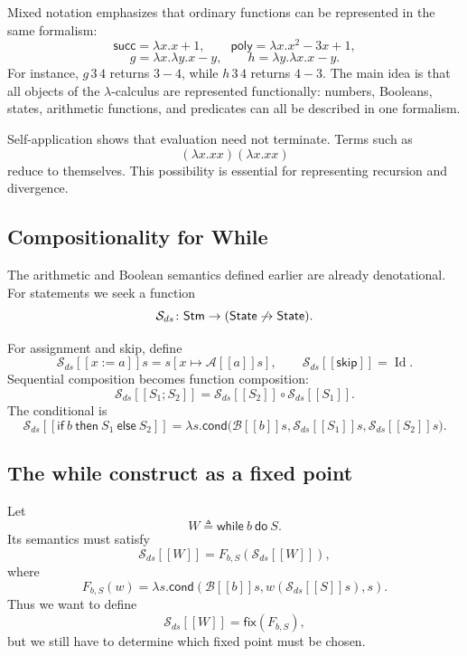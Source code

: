 \documentclass[a4paper]{article}
\newcommand{\State}{\mathsf{State}}
\newcommand{\Stm}{\mathsf{Stm}}
\newcommand{\skipc}{\mathsf{skip}}
\newcommand{\cond}{\mathsf{cond}}
\newcommand{\fix}{\mathsf{fix}}
\newcommand{\Id}{\operatorname{Id}}
\newcommand{\sem}[1]{[\![#1]\!]}
\begin{document}
Mixed notation emphasizes that ordinary functions can be represented in the same formalism:
\[
    \mathsf{succ}=\lambda x.x+1,
    \qquad
    \mathsf{poly}=\lambda x.x^2-3x+1,
\]
\[
    g=\lambda x.\lambda y.x-y,
    \qquad
    h=\lambda y.\lambda x.x-y.
\]
For instance, \(g\,3\,4\) returns \(3-4\), while \(h\,3\,4\) returns \(4-3\).
The main idea is that all objects of the \(\lambda\)-calculus are represented functionally: numbers, Booleans, states, arithmetic functions, and predicates can all be described in one formalism.

Self-application shows that evaluation need not terminate. Terms such as
\[
    (\lambda x.xx)(\lambda x.xx)
\]
reduce to themselves.
This possibility is essential for representing recursion and divergence.

\subsection{Compositionality for While}

The arithmetic and Boolean semantics defined earlier are already denotational.
For statements we seek a function
\[
    \mathcal S_{ds}\colon\Stm\fromto(\State\not\to\State).
\]

For assignment and skip, define
\[
    \mathcal S_{ds}\sem{x:=a}s
    =s[x\mapsto\mathcal A\sem{a}s],
    \qquad
    \mathcal S_{ds}\sem{\skipc}=\Id.
\]
Sequential composition becomes function composition:
\[
    \mathcal S_{ds}\sem{S_1;S_2}
    =
    \mathcal S_{ds}\sem{S_2}\circ\mathcal S_{ds}\sem{S_1}.
\]
The conditional is
\[
    \mathcal S_{ds}\sem{\mathsf{if}\ b\ \mathsf{then}\ S_1\ \mathsf{else}\ S_2}
    =
    \lambda s.\cond\bigl(
        \mathcal B\sem{b}s,
        \mathcal S_{ds}\sem{S_1}s,
        \mathcal S_{ds}\sem{S_2}s
    \bigr).
\]

\subsection{The while construct as a fixed point}

Let
\[
    W\triangleq\mathsf{while}\ b\ \mathsf{do}\ S.
\]
Its semantics must satisfy
\[
    \mathcal S_{ds}\sem{W}
    =
    F_{b,S}(\mathcal S_{ds}\sem{W}),
\]
where
\[
    F_{b,S}(w)
    =
    \lambda s.\cond\left(
        \mathcal B\sem{b}s,
        w(\mathcal S_{ds}\sem{S}s),
        s
    \right).
\]
Thus we want to define
\[
    \mathcal S_{ds}\sem{W}
    =
    \fix(F_{b,S}),
\]
but we still have to determine which fixed point must be chosen.
\end{document}
